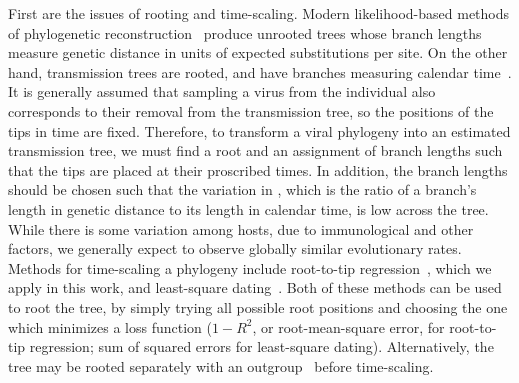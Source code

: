 First are the issues of rooting and time-scaling. Modern likelihood-based
methods of phylogenetic reconstruction~\autocite[\eg][]{price2010fasttree,
stamatakis2014raxml} produce unrooted trees whose branch lengths measure
genetic distance in units of expected substitutions per site. On the other
hand, transmission trees are rooted, and have branches measuring calendar
time~\autocite{pybus2009evolutionary}. It is generally assumed that sampling a
virus from the individual also corresponds to their removal from the
transmission tree, so the positions of the tips in time are fixed. Therefore,
to transform a viral phylogeny into an estimated transmission tree, we must
find a root and an assignment of branch lengths such that the tips are placed
at their proscribed times. In addition, the branch lengths should be chosen
such that the variation in , which is the ratio of a
branch's length in genetic distance to its length in calendar time, is low
across the tree. While there is some variation among hosts, due to
immunological and other factors, we generally expect to observe globally
similar evolutionary rates. Methods for time-scaling a phylogeny include
root-to-tip regression~\autocite{shankarappa1999consistent, korber2000timing,
drummond2003inference}, which we apply in this work, and least-square
dating~\autocite{to2015fast}. Both of these methods can be used to root the
tree, by simply trying all possible root positions and choosing the one which
minimizes a loss function ($1-R^2$, or root-mean-square error, for root-to-tip
regression; sum of squared errors for least-square dating). Alternatively, the
tree may be rooted separately with an outgroup~\autocite{li1988rates} before
time-scaling.

